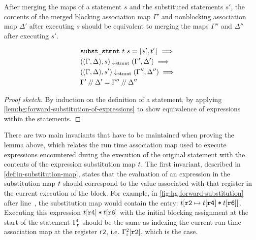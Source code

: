 \begin{lemma}%
  \label{lem:hg:equivalence-of-statement-subst}

  After merging the maps of a statement $s$ and the substituted statements $s'$,
  the contents of the merged blocking association map $\Gamma'$ and nonblocking
  association map $\Delta'$ after executing $s$ should be equivalent to merging
  the maps $\Gamma''$ and $\Delta''$ after executing $s'$.

  {\normalfont
    \begin{equation}
      \begin{aligned}
        &\texttt{subst\_stmnt}\ t\ s = \lfloor s', t' \rfloor\implies\\
        &((\Gamma, \Delta), s) \downarrow_{\text{stmnt}} (\Gamma', \Delta')
          \implies\\
        &((\Gamma, \Delta), s') \downarrow_{\text{stmnt}} (\Gamma'', \Delta'')
          \implies\\
        &\Gamma' \mathbin{/\kern-2pt/} \Delta' = \Gamma'' \mathbin{/\kern-2pt/} \Delta''
      \end{aligned}
    \end{equation}}

  \begin{proof}[Proof sketch]
    By induction on the definition of a statement, by applying
    \cref{lem:hg:forward-substitution-of-expressions} to show equivalence of
    expressions within the statements.
  \end{proof}
\end{lemma}

There are two main invariants that have to be maintained when proving the lemma
above, which relates the run time association map used to execute expressions
encountered during the execution of the original statement with the contents of
the expression substitution map $t$.  The first invariant, described in
\cref{def:in-substitution-map}, states that the evaluation of an expression in
the substitution map $t$ should correspond to the value associated with
that register in the current execution of the block.  For example, in
\cref{fig:hg:forward-substitution} after line~, the substitution
map would contain the entry:
$t\!\left[\texttt{r2} \mapsto t\!\left[\texttt{r4}\right]
  \mathbin{\texttt{*}} t\!\left[\texttt{r6}\right]\right]$.  Executing this expression
$t\!\left[\texttt{r4}\right] \mathbin{\texttt{*}} t\!\left[\texttt{r6}\right]$
with the initial blocking assignment at the start of the statement
${\Gamma}^{0}_{\mathrm r}$ should be the same as indexing the current
run time association map at the register \texttt{r2},
i.e. ${\Gamma}^{2}_{\mathrm r}\!\left[\texttt{r2}\right]$, which is the case.

